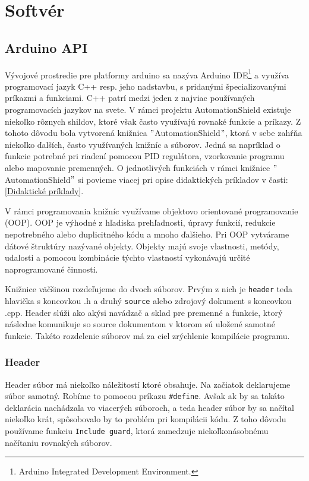 \section{Softvér}
\subsection{Arduino API}

Vývojové prostredie pre platformy arduino sa nazýva Arduino IDE\footnote[5]{Arduino Integrated Development Environment.} a využíva programovací jazyk C++ resp. jeho nadstavbu, s pridanými špecializovanými príkazmi a funkciami. C++ patrí medzi jeden z najviac používaných programovacích jazykov na svete. V rámci projektu AutomationShield existuje niekoľko rôznych shildov, ktoré však často využívajú rovnaké funkcie a príkazy. Z tohoto dôvodu bola vytvorená knižnica $"$AutomationShield$"$, ktorá v sebe zahŕňa niekoľko ďalších, často využívaných knižníc a súborov. Jedná sa napríklad o funkcie potrebné pri riadení pomocou PID regulátora, vzorkovanie programu alebo mapovanie premenných. O jednotlivých funkciách v rámci knižnice $"$AutomationShield$"$ si povieme viacej pri opise didaktických príkladov v časti:\ref{Didaktické príklady}.

V rámci programovania knižníc využívame objektovo orientované programovanie \newline (OOP)\cite{oop}. OOP je výhodné z hľadiska prehľadnosti, úpravy funkcií, redukcie nepotrebného alebo duplicitného kódu a mnoho ďalšieho. Pri OOP vytvárame dátové štruktúry nazývané objekty. Objekty majú svoje vlastnosti, metódy, udalosti a pomocou kombinácie týchto vlastností vykonávajú určité naprogramované činnosti. 

Knižnice väčšinou rozdeľujeme do dvoch súborov. Prvým z nich je \verb|header| teda hlavička s koncovkou .h a druhý \verb|source| alebo zdrojový dokument s koncovkou .cpp. Header slúži ako akýsi navádzač a sklad pre premenné a funkcie, ktorý následne komunikuje so source dokumentom v ktorom sú uložené samotné funkcie.
Takéto rozdelenie súborov má za ciel zrýchlenie kompilácie programu.


\subsubsection{Header}

Header súbor má niekoľko náležitostí ktoré obsahuje. Na začiatok deklarujeme súbor samotný. Robíme to pomocou príkazu \verb|#define|. Avšak ak by sa takáto deklarácia nachádzala vo viacerých súboroch, a teda header súbor by sa načítal niekoľko krát, spôsobovalo by to problém pri kompilácii kódu. Z toho dôvodu používame funkciu \verb|Include guard|, ktorá zamedzuje niekoľkonásobnému načítaniu rovnakých súborov. 

